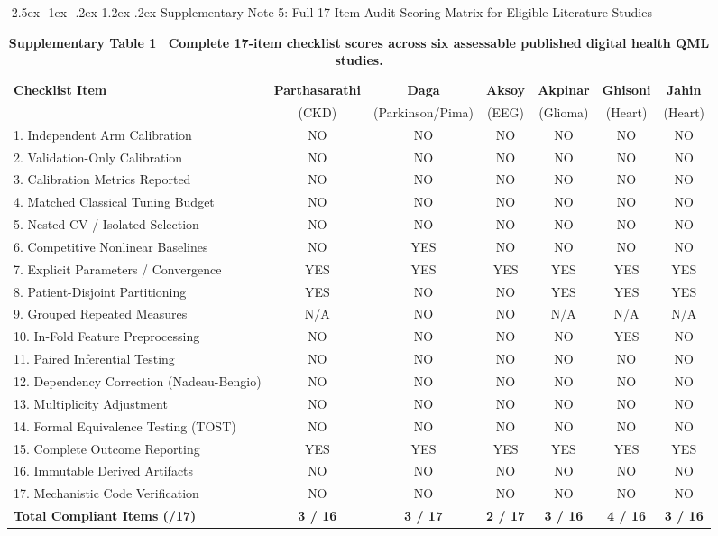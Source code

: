 \documentclass[10pt,a4paper]{article}
\makeatletter
\renewcommand{\section}{\@startsection{section}{1}{\z@}%
  {-2.5ex \@plus -1ex \@minus -.2ex}%
  {1.2ex \@plus.2ex}%
  {\normalfont\Large\sffamily\bfseries\color{naturedark}}}
\makeatother
\begin{document}
\section{Supplementary Note 5: Full 17-Item Audit Scoring Matrix for Eligible Literature Studies}

\begin{table}[h]
\centering
\scriptsize
\caption*{\textbf{\textsf{Supplementary Table 1 \textbar\ Complete 17-item checklist scores across six assessable published digital health QML studies.}}}
\begin{tabular}{lcccccc}
\toprule
\textbf{Checklist Item} & \textbf{Parthasarathi} & \textbf{Daga} & \textbf{Aksoy} & \textbf{Akpinar} & \textbf{Ghisoni} & \textbf{Jahin} \\
& (CKD) & (Parkinson/Pima) & (EEG) & (Glioma) & (Heart) & (Heart) \\
\midrule
1. Independent Arm Calibration & NO & NO & NO & NO & NO & NO \\
2. Validation-Only Calibration & NO & NO & NO & NO & NO & NO \\
3. Calibration Metrics Reported & NO & NO & NO & NO & NO & NO \\
4. Matched Classical Tuning Budget & NO & NO & NO & NO & NO & NO \\
5. Nested CV / Isolated Selection & NO & NO & NO & NO & NO & NO \\
6. Competitive Nonlinear Baselines & NO & YES & NO & NO & NO & NO \\
7. Explicit Parameters / Convergence & YES & YES & YES & YES & YES & YES \\
8. Patient-Disjoint Partitioning & YES & NO & NO & YES & YES & YES \\
9. Grouped Repeated Measures & N/A & NO & NO & N/A & N/A & N/A \\
10. In-Fold Feature Preprocessing & NO & NO & NO & NO & YES & NO \\
11. Paired Inferential Testing & NO & NO & NO & NO & NO & NO \\
12. Dependency Correction (Nadeau-Bengio) & NO & NO & NO & NO & NO & NO \\
13. Multiplicity Adjustment & NO & NO & NO & NO & NO & NO \\
14. Formal Equivalence Testing (TOST) & NO & NO & NO & NO & NO & NO \\
15. Complete Outcome Reporting & YES & YES & YES & YES & YES & YES \\
16. Immutable Derived Artifacts & NO & NO & NO & NO & NO & NO \\
17. Mechanistic Code Verification & NO & NO & NO & NO & NO & NO \\
\midrule
\textbf{Total Compliant Items (/17)} & \textbf{3 / 16} & \textbf{3 / 17} & \textbf{2 / 17} & \textbf{3 / 16} & \textbf{4 / 16} & \textbf{3 / 16} \\
\bottomrule
\end{tabular}
\end{table}
\end{document}
